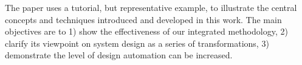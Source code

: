 The paper uses a tutorial, but representative example, to illustrate the central concepts and techniques introduced and developed in this work. The main objectives are to 1) show the effectiveness of our integrated methodology, 2) clarify its viewpoint on system design as a series of transformations, 3) demonstrate the level of design automation can be increased. 



